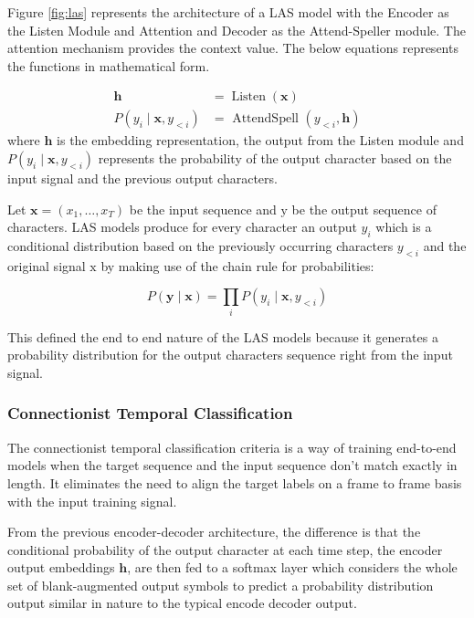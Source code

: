 Figure \ref{fig:las} represents the architecture of a LAS model with the Encoder as the Listen Module and Attention and Decoder as the Attend-Speller module. The attention mechanism provides the context value. The below equations represents the functions in mathematical form.

$$
\begin{aligned}
\mathbf{h} &=\operatorname{Listen}(\mathbf{x}) \\
P\left(y_{i} \mid \mathbf{x}, y_{<i}\right) &=\text { AttendSpell }\left(y_{<i}, \mathbf{h}\right)
\end{aligned}
$$
where $ \mathbf{h}$ is the embedding representation, the output from the Listen module and $P\left(y_{i} \mid \mathbf{x}, y_{<i}\right)$ represents the probability of the output character based on the input signal and the previous output characters.

Let $\mathbf{x}=\left(x_{1}, \ldots, x_{T}\right)$ be the input sequence and $\mathrm{y}$ be the output sequence of characters. LAS models produce for every character an output $y_{i}$ which is a conditional distribution based on the previously occurring characters $y_{<i}$ and the original signal $\mathrm{x}$ by making use of the chain rule for probabilities:

$$
P(\mathbf{y} \mid \mathbf{x})=\prod_{i} P\left(y_{i} \mid \mathbf{x}, y_{<i}\right)
$$

This defined the end to end nature of the LAS models because it generates a probability distribution for the output characters sequence right from the input signal. 

\subsubsection{Connectionist Temporal Classification}
The connectionist temporal classification criteria is a way of training end-to-end models when the target sequence and the input sequence don't match exactly in length. It eliminates the need to align the target labels on a frame to frame basis with the input training signal. 

From the previous encoder-decoder architecture, the difference is that the conditional probability of the output character at each time step, the encoder output embeddings $\mathbf{h}$, are then fed to a softmax layer which considers the whole set of blank-augmented output symbols to predict a probability distribution output similar in nature to the typical encode decoder output.
